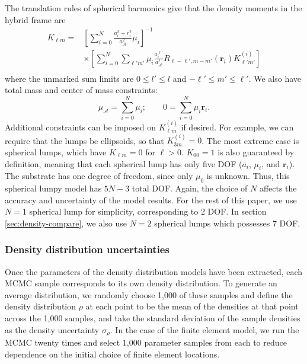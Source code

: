 \documentclass[fleqn,usenatbib]{mnras}
\newcommand{\brackets}[1]{\left[ #1 \right]}
\begin{document}
The translation rules of spherical harmonics \citep{Gelderen1998TheSO} give that the density moments in the hybrid frame are
\begin{equation}
  \begin{aligned}
    K_{\ell m} = &\brackets{\sum_{i=0}^N \frac{a_i^2 + r_i^2}
    {a_\mathcal{A}^2}\mu_i}^{-1} \\
    &\times \brackets{\sum_{i=0}^N \sum_{\ell' m'}\mu_i
    \frac{a_i^{\ell'}}{a_\mathcal{A}^\ell}
    R_{\ell - \ell', m - m'}(\bm r_i)K_{\ell' m'}^{(i)}} \\
  \end{aligned}
\end{equation}
where the unmarked sum limits are $0 \leq l' \leq l$ and $-\ell' \leq m' \leq \ell'$. We also have total mass and center of mass constraints:
\begin{equation}
  \mu_\mathcal{A} = \sum_{i=0}^N \mu_i;  \qquad 0 = \sum_{i=0}^N \mu_i \bm r_i.
\end{equation}
Additional constraints can be imposed on $K_{\ell m}^{(i)}$ if desired. For example, we can require that the lumps be ellipsoids, so that $K_{3 m}^{(i)} = 0$. The most extreme case is spherical lumps, which have $K_{\ell m} = 0$ for $\ell > 0$. $K_{00}=1$ is also guaranteed by definition, meaning that each spherical lump has only five DOF ($a_i$, $\mu_i$, and $\bm r_i$). The substrate has one degree of freedom, since only $\mu_0$ is unknown. Thus, this spherical lumpy model has $5N - 3$ total DOF. Again, the choice of $N$ affects the accuracy and uncertainty of the model results. For the rest of this paper, we use $N=1$ spherical lump for simplicity, corresponding to 2 DOF. In section \ref{sec:density-compare}, we also use $N=2$ spherical lumps which possesses 7 DOF.


\subsubsection{Density distribution uncertainties}
\label{sec:density-uncertainty-model}

Once the parameters of the density distribution models have been extracted, each MCMC sample corresponds to its own density distribution. To generate an average distribution, we randomly choose 1,000 of these samples and define the density distribution $\rho$ at each point to be the mean of the densities at that point across the 1,000 samples, and take the standard deviation of the sample densities as the density uncertainty $\sigma_\rho$. In the case of the finite element model, we run the MCMC twenty times and select 1,000 parameter samples from each to reduce dependence on the initial choice of finite element locations. 
\end{document}
